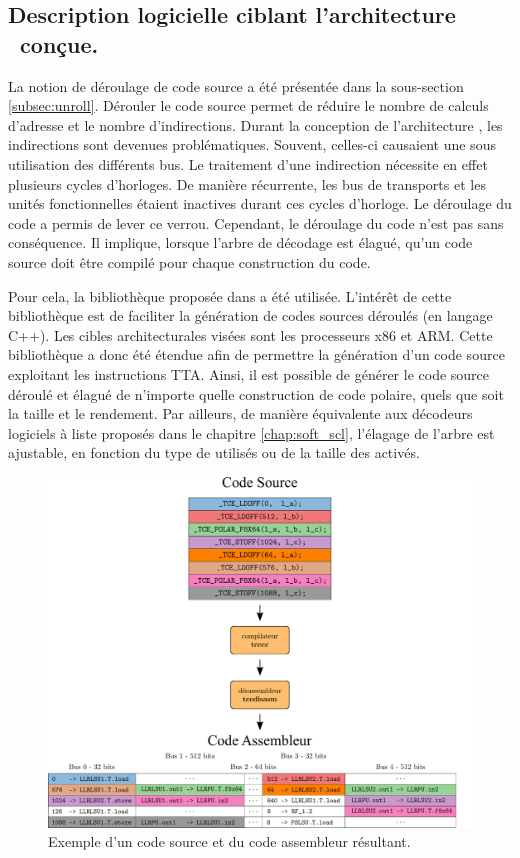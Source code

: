 \subsection{Description logicielle ciblant l'architecture \TTSC~conçue.}

La notion de déroulage de code source a été présentée dans la sous-section \ref{subsec:unroll}. Dérouler le code source permet de réduire le nombre de calculs d'adresse et le nombre d'indirections. Durant la conception de l'architecture \TTSC, les indirections sont devenues problématiques. Souvent, celles-ci causaient une sous utilisation des différents bus. Le traitement d'une indirection nécessite en effet plusieurs cycles d'horloges. De manière récurrente, les bus de transports et les unités fonctionnelles étaient inactives durant ces cycles d'horloge. Le déroulage du code a permis de lever ce verrou. Cependant, le déroulage du code n'est pas sans conséquence. Il implique, lorsque l'arbre de décodage est élagué, qu'un code source doit être compilé pour chaque construction du code.

Pour cela, la bibliothèque proposée dans \cite{cassagne_efficient_2015} a été utilisée. L'intérêt de cette bibliothèque est de faciliter la génération de codes sources déroulés (en langage C++). Les cibles architecturales visées sont les processeurs x86 et ARM. Cette bibliothèque a donc été étendue afin de permettre la génération d'un code source exploitant les instructions TTA. Ainsi, il est possible de générer le code source déroulé et élagué de n'importe quelle construction de code polaire, quels que soit la taille et le rendement. Par ailleurs, de manière équivalente aux décodeurs logiciels à liste proposés dans le chapitre \ref{chap:soft_scl}, l'élagage de l'arbre est ajustable, en fonction du type de \noeuds utilisés ou de la taille des \noeuds activés.


\begin{figure}[t]
\centering
\includegraphics[width=\textwidth]{main/ch4_fig/ilp_1}
\caption{Exemple d'un code source et du code assembleur résultant.}
\label{fig:ilp_1}
\end{figure}


